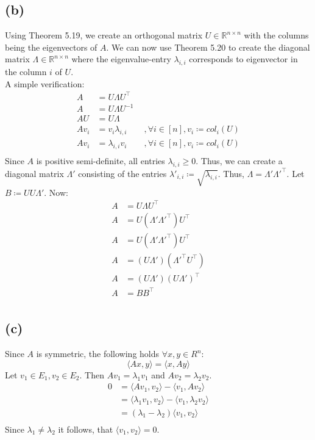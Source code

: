 \documentclass[12pt]{article}
\begin{document}
\subsection*{(b)}
Using Theorem 5.19, we create an orthogonal matrix $U \in \mathbb{R}^{n \times n}$ with the columns being the eigenvectors of $A$. We can now use Theorem 5.20 to create the diagonal matrix $\Lambda \in \mathbb{R}^{n \times n}$ where the eigenvalue-entry $\lambda_{i,i}$ corresponds to eigenvector in the column $i$ of $U$. \\
A simple verification:
\begin{align*}
	A &= U \Lambda U^\top \\
	A &= U \Lambda U^{-1} \\
	A U &= U \Lambda \\
	A v_i &= v_i \lambda_{i,i} \qquad, \forall i \in \left[n\right], v_i \coloneqq col_i(U) \\
	A v_i &= \lambda_{i,i} v_i \qquad, \forall i \in \left[n\right], v_i \coloneqq col_i(U) \\
\end{align*}
Since $A$ is positive semi-definite, all entries $\lambda_{i,i} \geq 0$. Thus, we can create a diagonal matrix $\Lambda'$ consisting of the entries $\lambda'_{i,i} \coloneqq \sqrt{\lambda_{i,i}}$. Thus, $\Lambda = \Lambda' \Lambda'^\top$. Let $B \coloneqq U U \Lambda'$. Now:
\begin{align*}
	A &= U \Lambda U^\top \\
	A &= U (\Lambda' \Lambda'^\top) U^\top \\
	A &= U (\Lambda' \Lambda'^\top) U^\top \\
	A &= (U \Lambda') (\Lambda'^\top U^\top) \\
	A &= (U \Lambda') (U \Lambda')^\top \\
	A &= B B^\top \\
\end{align*}

\subsection*{(c)}
Since $A$ is symmetric, the following holds $\forall x,y \in R^n$:
\begin{equation*}
	\langle Ax,y \rangle = \langle x,Ay \rangle
\end{equation*}
Let $v_1 \in E_1, v_2 \in E_2$. Then $A v_1 = \lambda_1 v_1$ and $A v_2 = \lambda_2 v_2$.
\begin{align*}
	0 &= \langle Av_1,v_2 \rangle - \langle v_1,Av_2 \rangle \\
	&= \langle \lambda_1v_1,v_2 \rangle - \langle v_1,\lambda_2v_2 \rangle \\
	&= (\lambda_1 - \lambda_2) \langle v_1,v_2 \rangle \\
\end{align*}
Since $\lambda_1 \neq \lambda_2$ it follows, that $\langle v_1,v_2 \rangle = 0$.
\end{document}
